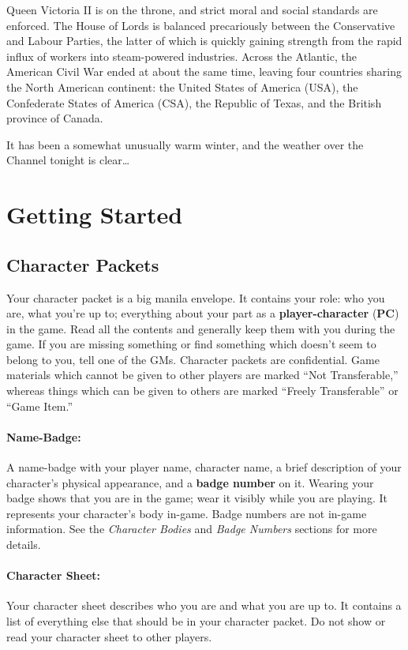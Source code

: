 \documentclass[sheet]{airship}
\begin{document}
Queen Victoria II is on the throne, and strict moral and social standards are enforced. The House of Lords is balanced precariously between the Conservative and Labour Parties, the latter of which is quickly gaining strength from the rapid influx of workers into steam-powered industries. Across the Atlantic, the American Civil War ended at about the same time, leaving four countries sharing the North American continent: the United States of America (USA), the Confederate States of America (CSA), the Republic of Texas, and the British province of Canada.

It has been a somewhat unusually warm winter, and the weather over the Channel tonight is clear\ldots{}

\section{Getting Started}

\subsection{Character Packets}

Your character packet is a big manila envelope.  It contains your
role: who you are, what you're up to; everything about your part as a
{\bf player-character} ({\bf PC}) in the game.  Read all the contents
and generally keep them with you during the game.  If you are missing
something or find something which doesn't seem to belong to you, tell
one of the GMs.  Character packets are confidential.  Game materials
which cannot be given to other players are marked ``Not
Transferable,'' whereas things which can be given to others are marked
``Freely Transferable'' or ``Game Item.''

\paragraph{Name-Badge:} A name-badge with your player name, character
name, a brief description of your character's physical appearance, and
a {\bf badge number} on it.  Wearing your badge shows that you are in
the game; wear it visibly while you are playing.  It represents your
character's body in-game.  Badge numbers are not in-game information.
See the {\em Character Bodies} and {\em Badge Numbers} sections for
more details.

\paragraph{Character Sheet:} Your character sheet describes who you
are and what you are up to.  It contains a list of everything else
that should be in your character packet.  Do not show or read your
character sheet to other players.
\end{document}
